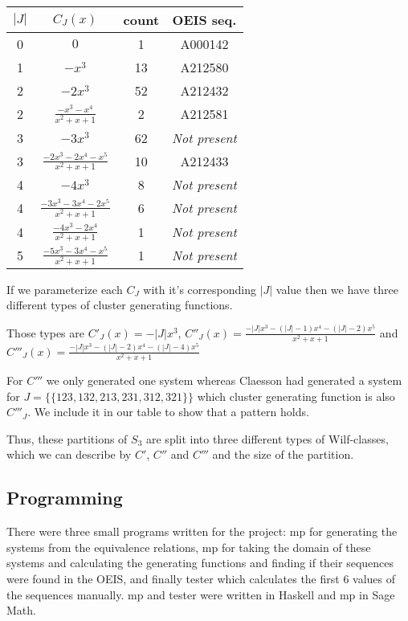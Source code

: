 \documentclass[a4paper, 11pt, english]{article}
\theoremstyle{definition}
\newcommand{\Sym}{S}
\begin{document}
\begin{center}
\begin{tabular}{c|c|c|c}
    $|J|$ & $C_J(x)$ & count & OEIS seq. \\
    \hline
    0 & $0$ & 1 & A000142 \\
    1 & $-x^3$ & 13 & A212580 \\
    2 & $-2x^3$ & 52 & A212432 \\
    2 & $\frac{-x^3-x^4}{x^2+x+1}$ & 2 & A212581 \\
    3 & $-3x^3$ & 62 & \emph{Not present} \\
    3 & $\frac{-2x^3-2x^4-x^5}{x^2+x+1}$ & 10 & A212433 \\
    4 & $-4x^3$ & 8 & \emph{Not present} \\
    4 & $\frac{-3x^3-3x^4-2x^5}{x^2+x+1}$ & 6 & \emph{Not present}\\
    4 & $\frac{-4x^3-2x^4}{x^2+x+1}$ & 1 & \emph{Not present} \\ 
    \hline
    \hline
    5 & $\frac{-5x^3-3x^4-x^5}{x^2+x+1}$ & 1 & \emph{Not present} \\ 
\end{tabular}
\end{center}

If we parameterize each $C_J$ with it's corresponding $|J|$ value then we have
three different types of cluster generating functions.

Those types are $C'_J(x) = -|J|x^3$, $C''_J(x) = \frac{-|J|x^3-(|J|-1)x^4-(|J|-2)x^5}{x^2+x+1}$
and $C'''_J(x) = \frac{-|J|x^3-(|J|-2)x^4-(|J|-4)x^5}{x^2+x+1}$

For $C'''$ we only generated one system whereas Claesson had generated a system for
$J = \{\{ 123, 132, 213, 231, 312, 321 \}\}$ which cluster generating function
is also $C'''_J$. We include it in our table to show that a pattern holds.

Thus, these partitions of $\Sym_3$ are split into three different types
of Wilf-classes, which we can describe by $C'$, $C''$ and $C'''$ and the size
of the partition.

\subsection{Programming}
There were three small programs written for the project: mp for generating the
systems from the equivalence relations, mp for taking the domain of these
systems and calculating the generating functions and finding if their sequences
were found in the OEIS, and finally tester which calculates the first 6 values
of the sequences manually. mp and tester were written in Haskell and mp in Sage Math. 
\end{document}
